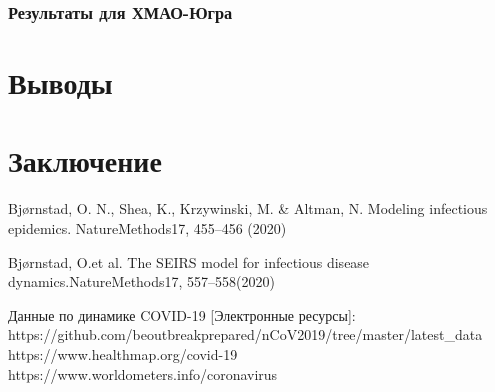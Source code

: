 \documentclass{article}
\begin{document}
\subsubsection{Результаты для ХМАО-Югра}

\section{Выводы}

\section{Заключение}

\begin{thebibliography}{9}

 Bjørnstad, O. N., Shea, K., Krzywinski, M. & Altman, N. Modeling infectious epidemics. NatureMethods17, 455–456 (2020)

 Bjørnstad, O.et al. The SEIRS model for infectious disease dynamics.NatureMethods17, 557–558(2020)

 Данные по динамике COVID-19 [Электронные ресурсы]:\\ https://github.com/beoutbreakprepared/nCoV2019/tree/master/latest\_data\\
https://www.healthmap.org/covid-19\\
https://www.worldometers.info/coronavirus\\

\end{thebibliography}
\end{document}
